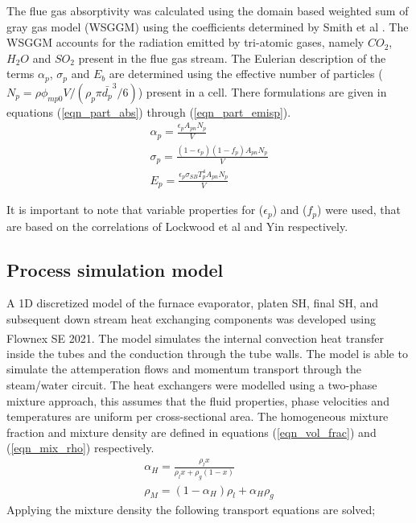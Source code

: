 \documentclass[review]{elsarticle}
\begin{document}
The flue gas absorptivity was calculated using the domain based weighted sum of gray gas model (WSGGM) using the coefficients determined by Smith et al \cite{Smith1982}. The WSGGM accounts for the radiation emitted by tri-atomic gases, namely $CO_2$, $H_2O$ and $SO_2$ present in the flue gas stream. The Eulerian description of the terms $\alpha_p$, $\sigma_p$ and $E_b$ are determined using the effective number of particles ($N_p = \rho \phi_{mp0} V / \left( \rho_p \pi \bar{d_p}^3 /6 \right)$) present in a cell. There formulations are given in equations (\ref{eqn_part_abs}) through (\ref{eqn_part_emisp}).
\begin{gather}
\alpha_p = \frac{\epsilon_p A_{pn}N_p}{V} \label{eqn_part_abs}\\
\sigma_p = \frac{(1-\epsilon_p)(1-f_p) A_{pn}N_p}{V} \label{eqn_part_scat} \\
E_p = \frac{\epsilon_p \sigma_{SB} T_p^4 A_{pn}N_p}{V}\label{eqn_part_emisp}
\end{gather}

It is important to note that variable properties for ($\epsilon_p$) and ($f_p$) were used, that are based on the correlations of Lockwood et al \cite{Lockwood1986} and Yin \citep{Yin2015} respectively.

\subsection{Process simulation model}
A 1D discretized model of the furnace evaporator, platen SH, final SH, and subsequent down stream heat exchanging components was developed using Flownex SE\textsuperscript{\textregistered} 2021. The model simulates the internal convection heat transfer inside the tubes and the conduction through the tube walls. The model is able to simulate the attemperation flows and momentum transport through the steam/water circuit. The heat exchangers were modelled using a two-phase mixture approach, this assumes that the fluid properties, phase velocities and temperatures are uniform per cross-sectional area. The homogeneous mixture fraction and mixture density are defined in equations (\ref{eqn_vol_frac}) and (\ref{eqn_mix_rho}) respectively.
\begin{gather}
\alpha_H = \frac{\rho_l x}{\rho_lx + \rho_g(1-x)} \label{eqn_vol_frac}\\  
\rho_M = (1-\alpha_H)\rho_l + \alpha_H\rho_g \label{eqn_mix_rho}
\end{gather}
Applying the mixture density the following transport equations are solved;
\end{document}
